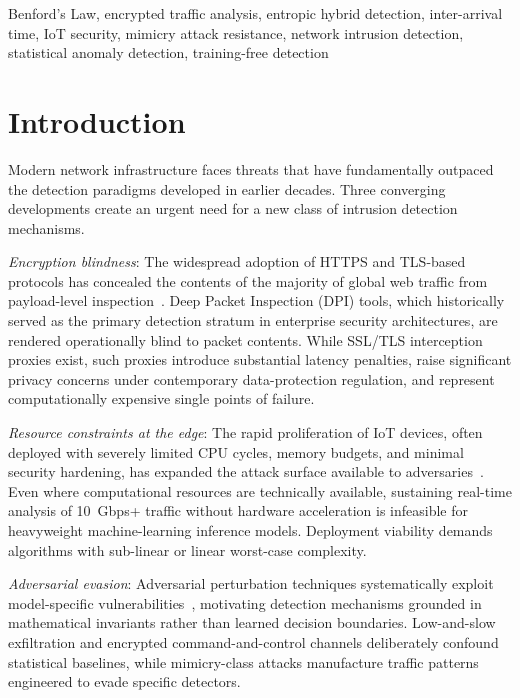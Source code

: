 \documentclass[conference]{IEEEtran}
\begin{document}
\begin{IEEEkeywords}
Benford's Law, encrypted traffic analysis, entropic hybrid detection,
inter-arrival time, IoT security, mimicry attack resistance, network
intrusion detection, statistical anomaly detection, training-free detection
\end{IEEEkeywords}

\section{Introduction}

Modern network infrastructure faces threats that have fundamentally outpaced
the detection paradigms developed in earlier decades. Three converging
developments create an urgent need for a new class of intrusion detection
mechanisms.

\textit{Encryption blindness}: The widespread adoption of HTTPS and TLS-based
protocols has concealed the contents of the majority of global web traffic
from payload-level inspection~\cite{b1}. Deep Packet Inspection (DPI) tools,
which historically served as the primary detection stratum in enterprise
security architectures, are rendered operationally blind to packet contents.
While SSL/TLS interception proxies exist, such proxies introduce substantial
latency penalties, raise significant privacy concerns under contemporary
data-protection regulation, and represent computationally expensive single
points of failure.

\textit{Resource constraints at the edge}: The rapid proliferation of IoT
devices, often deployed with severely limited CPU cycles, memory budgets,
and minimal security hardening, has expanded the attack surface available to
adversaries~\cite{b2}. Even where computational resources are technically
available, sustaining real-time analysis of 10~Gbps+ traffic without hardware
acceleration is infeasible for heavyweight machine-learning inference models.
Deployment viability demands algorithms with sub-linear or linear worst-case
complexity.

\textit{Adversarial evasion}: Adversarial perturbation techniques
systematically exploit model-specific vulnerabilities~\cite{b3}, motivating
detection mechanisms grounded in mathematical invariants rather than learned
decision boundaries. Low-and-slow exfiltration and encrypted command-and-control
channels deliberately confound statistical baselines, while mimicry-class
attacks manufacture traffic patterns engineered to evade specific detectors.
\end{document}
